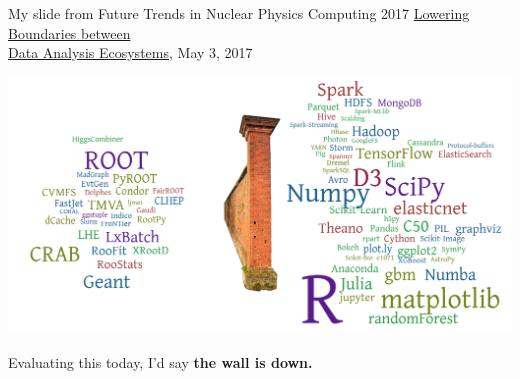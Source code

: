 \documentclass[aspectratio=169]{beamer}
\begin{document}
\begin{frame}{My slide from Future Trends in Nuclear Physics Computing 2017}
\vspace{0.5 cm}
{\small\textcolor{blue}{\href{https://indico.jlab.org/event/213/contributions/2154/}{Lowering Boundaries between \\ Data Analysis Ecosystems}}, May 3, 2017}

\vspace{-1 cm}
\includegraphics[width=\linewidth]{PLOTS/separation.png}

\vspace{-0.5 cm}
Evaluating this today, I'd say {\bf the wall is down.}
\end{frame}
\end{document}
